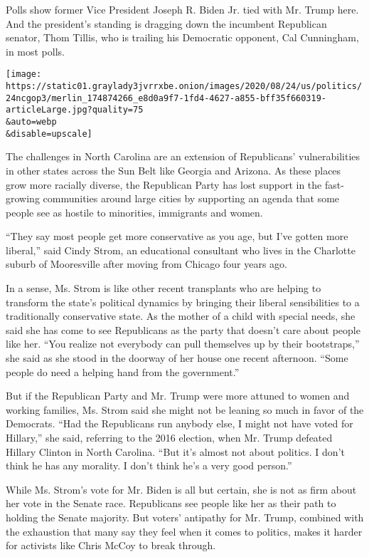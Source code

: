 Polls show former Vice President Joseph R. Biden Jr. tied with Mr. Trump
here. And the president's standing is dragging down the incumbent
Republican senator, Thom Tillis, who is trailing his Democratic
opponent, Cal Cunningham, in most polls.

\texttt{[image: https://static01.graylady3jvrrxbe.onion/images/2020/08/24/us/politics/24ncgop3/merlin\_174874266\_e8d0a9f7-1fd4-4627-a855-bff35f660319-articleLarge.jpg?quality=75\\\&auto=webp\\\&disable=upscale]}

The challenges in North Carolina are an extension of Republicans'
vulnerabilities in other states across the Sun Belt like Georgia and
Arizona. As these places grow more racially diverse, the Republican
Party has lost support in the fast-growing communities around large
cities by supporting an agenda that some people see as hostile to
minorities, immigrants and women.

``They say most people get more conservative as you age, but I've gotten
more liberal,'' said Cindy Strom, an educational consultant who lives in
the Charlotte suburb of Mooresville after moving from Chicago four years
ago.

In a sense, Ms. Strom is like other recent transplants who are helping
to transform the state's political dynamics by bringing their liberal
sensibilities to a traditionally conservative state. As the mother of a
child with special needs, she said she has come to see Republicans as
the party that doesn't care about people like her. ``You realize not
everybody can pull themselves up by their bootstraps,'' she said as she
stood in the doorway of her house one recent afternoon. ``Some people do
need a helping hand from the government.''

But if the Republican Party and Mr. Trump were more attuned to women and
working families, Ms. Strom said she might not be leaning so much in
favor of the Democrats. ``Had the Republicans run anybody else, I might
not have voted for Hillary,'' she said, referring to the 2016 election,
when Mr. Trump defeated Hillary Clinton in North Carolina. ``But it's
almost not about politics. I don't think he has any morality. I don't
think he's a very good person.''

While Ms. Strom's vote for Mr. Biden is all but certain, she is not as
firm about her vote in the Senate race. Republicans see people like her
as their path to holding the Senate majority. But voters' antipathy for
Mr. Trump, combined with the exhaustion that many say they feel when it
comes to politics, makes it harder for activists like Chris McCoy to
break through.


